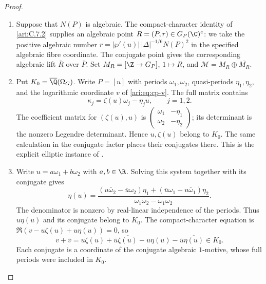 \begin{proof}
\begin{enumerate}[label=\arabic*.,leftmargin=*]
\item Suppose that $N(P)$ is algebraic. The compact-character
identity of \cref{ari:C.7.2} supplies an algebraic point
$R=(P,r)\in G_P(\C)^c$: we take the positive algebraic number
$r=|\wp'(u)|\,|\Delta|^{-1/6}N(P)^2$ in the specified
algebraic fibre coordinate. The conjugate point gives the
corresponding algebraic lift $\bar R$ over $\bar P$.
Set $M_R=[\Z\to G_P]$, $1\mapsto R$, and
$\mathcal M=M_R\oplus\overline{M_R}$.

\item Put $K_0=\overline\Q(\Omega_G)$. Write
$P=[u]$ with periods $\omega_1,\omega_2$, quasi-periods
$\eta_1,\eta_2$, and the logarithmic coordinate $v$ of
\eqref{ari:eq:cp-v}. The full matrix contains
\[
 \kappa_j=\zeta(u)\omega_j-\eta_j u,\qquad j=1,2.
\]
The coefficient matrix for $(\zeta(u),u)$ is
$\left(\begin{smallmatrix}\omega_1&-\eta_1\\
\omega_2&-\eta_2\end{smallmatrix}\right)$; its determinant
is the nonzero Legendre determinant. Hence $u,\zeta(u)$
belong to $K_0$. The same calculation in the conjugate factor
places their conjugates there. This is the explicit elliptic
instance of \cite[Remark~4.13, p.~20]{bertolin2022}.

\item Write $u=a\omega_1+b\omega_2$ with $a,b\in\R$.
Solving this system together with its conjugate gives
\begin{equation}\label{ari:eq:cp-real-linear}
 \eta(u)=
 \frac{(u\bar\omega_2-\bar u\omega_2)\eta_1
       +(\bar u\omega_1-u\bar\omega_1)\eta_2}
      {\omega_1\bar\omega_2-\bar\omega_1\omega_2}.
\end{equation}
The denominator is nonzero by real-linear independence of the
periods. Thus $u\eta(u)$ and its conjugate belong to $K_0$.
The compact-character equation is
$\Re(v-u\zeta(u)+u\eta(u))=0$, so
\begin{equation}\label{ari:eq:cp-relation}
 v+\bar v=u\zeta(u)+\bar u\overline{\zeta(u)}
                -u\eta(u)-\bar u\overline{\eta(u)}\in K_0.
\end{equation}
Each conjugate is a coordinate of the conjugate algebraic
$1$-motive, whose full periods were included in $K_0$.


\end{enumerate}
\end{proof}
